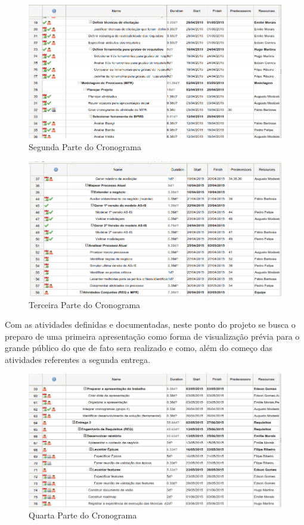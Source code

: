 \begin{figure}[!htb]
\centering
\includegraphics[scale=0.55]{figuras/cronograma2.png}
\caption{Segunda Parte do Cronograma}
\end{figure}

\begin{figure}[!htb]
\centering
\includegraphics[scale=0.55]{figuras/cronograma3.png}
\caption{Terceira Parte do Cronograma}
\end{figure}

Com as atividades definidas e documentadas, neste ponto do projeto se busca o preparo de uma primeira apresentação como forma de visualização prévia para o grande público do que de fato sera realizado e como, além do começo das atividades referentes a segunda entrega.

\begin{figure}[!htb]
\centering
\includegraphics[scale=0.55]{figuras/cronograma4.png}
\caption{Quarta Parte do Cronograma}
\end{figure}

